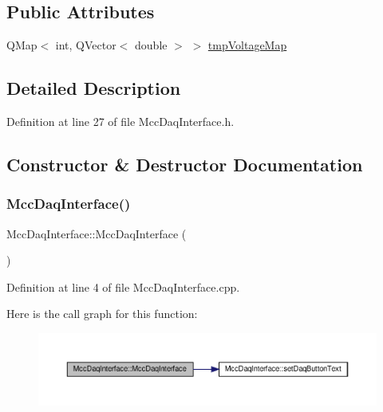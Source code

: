 \subsection*{Public Attributes}
\begin{DoxyCompactItemize}
\item 
Q\+Map$<$ int, Q\+Vector$<$ double $>$ $>$ \hyperlink{class_mcc_daq_interface_ae1c7212ef6250f2900a21029a8506a3e}{tmp\+Voltage\+Map}
\end{DoxyCompactItemize}


\subsection{Detailed Description}


Definition at line 27 of file Mcc\+Daq\+Interface.\+h.



\subsection{Constructor \& Destructor Documentation}
\mbox{\label{class_mcc_daq_interface_a1dc6d2ded354eec0d0a702a8d4639147}} 
\subsubsection{\texorpdfstring{Mcc\+Daq\+Interface()}{MccDaqInterface()}}
{\footnotesize\ttfamily Mcc\+Daq\+Interface\+::\+Mcc\+Daq\+Interface (\begin{DoxyParamCaption}{ }\end{DoxyParamCaption})}



Definition at line 4 of file Mcc\+Daq\+Interface.\+cpp.

Here is the call graph for this function\+:
\nopagebreak
\begin{figure}[H]
\begin{center}
\leavevmode
\includegraphics[width=350pt]{class_mcc_daq_interface_a1dc6d2ded354eec0d0a702a8d4639147_cgraph}
\end{center}
\end{figure}
\mbox{\label{class_mcc_daq_interface_a97a44a3991abe59439a33b47f2636ae1}} 

